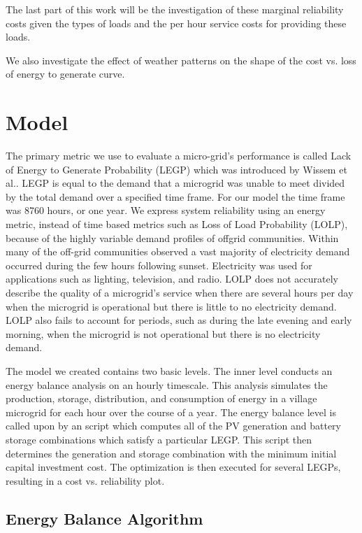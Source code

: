 \documentclass{article}
\begin{document}
The last part of this work will be the investigation of these marginal
reliability costs given the types of loads and the per hour service
costs for providing these loads.

We also investigate the effect of weather patterns on the shape of the
cost vs. loss of energy to generate curve.


\section{Model}
The primary metric we use to evaluate a micro-grid's performance is called Lack of Energy to Generate Probability (LEGP) which was introduced by Wissem et al.\cite{}.
LEGP is equal to the demand that a microgrid was unable to meet divided by the total demand over a specified time frame. 
For our model the time frame was 8760 hours, or one year. 
We express system reliability using an energy metric, instead of time based metrics such as Loss of Load Probability (LOLP), because of the highly variable demand profiles of offgrid communities. 
Within many of the off-grid communities observed a vast majority of electricity demand occurred during the few hours following sunset.
Electricity was used for applications such as lighting, television, and radio. 
LOLP does not accurately describe the quality of a microgrid's service when there are several hours per day when the microgrid is operational but there is little to no electricity demand. 
LOLP also fails to account for periods, such as during the late evening and early morning, when the microgrid is not operational but there is no electricity demand.

The model we created contains two basic levels.
The inner level conducts an energy balance analysis on an hourly timescale.
This analysis simulates the production, storage, distribution, and consumption of energy in a village microgrid for each hour over the course of a year. 
The energy balance level is called upon by an script which computes all of the PV generation and battery storage combinations which satisfy a particular LEGP. 
This script then determines the generation and storage combination with the minimum initial capital investment cost. 
The optimization is then executed for several LEGPs, resulting in a cost vs. reliability plot.

\subsection{Energy Balance Algorithm}
\end{document}

